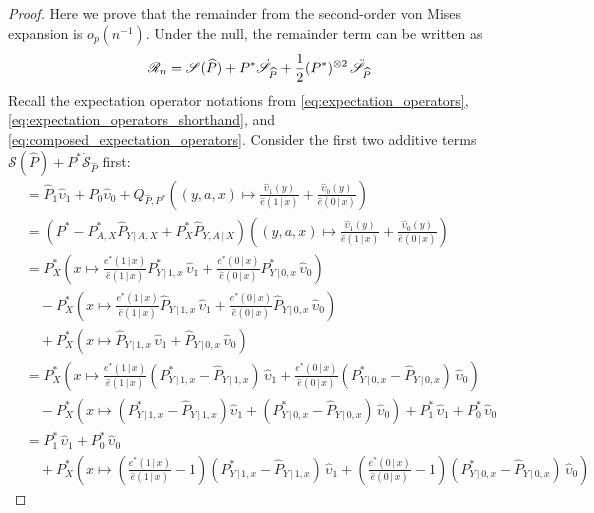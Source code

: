 \documentclass{article}
\theoremstyle{plain}
\theoremstyle{definition}
\theoremstyle{remark}
\newcommand{\of}[1]{\left(#1\right)}
\newcommand{\ucR}{\mathscr{R}}
\newcommand{\wh}[1]{\widehat{#1}}
\newcommand{\hP}{\widehat{P}}
\newcommand{\1}{\mathbbm{1}}
\newcommand{\STE}{\mathscr{S}}
\theoremstyle{plain}
\theoremstyle{definition}
\newcommand{\mymid}{\,|\,}
\begin{document}
\begin{proof}
    Here we prove that the remainder from the second-order von Mises expansion is $o_p(n^{-1})$. 
    Under the null, the remainder term can be written as 
    \[
    \ucR_n = \STE(\hP) + P^* \dot{\STE}_{\hP} + \frac{1}{2} (P^*)^{\otimes 2}\,\Ddot{\STE}_{\hP}
    \]
Recall the expectation operator notations from \eqref{eq:expectation_operators}, \eqref{eq:expectation_operators_shorthand}, and \eqref{eq:composed_expectation_operators}. Consider the first two additive terms $\STE(\hP) + P^* \dot{\STE}_{\hP}$ first:
\begin{align*}
      &= \hP_1 \wh\upsilon_1 + \hP_0 \wh\upsilon_0 + Q_{\hP, P^*} \of{(y,a,x) \mapsto \frac{\wh\upsilon_1(y)}{\hat{e}(1 \mymid x)} + \frac{\wh\upsilon_0(y)}{\hat{e}(0 \mymid x)}}\\
     &= \of{P^* - P^*_{A, X} \hP_{Y \mymid A, X} + P^*_X \hP_{Y, A \mymid X}} \of{(y,a,x) \mapsto \frac{\wh\upsilon_1(y)}{\hat{e}(1 \mymid x)} + \frac{\wh\upsilon_0(y)}{\hat{e}(0 \mymid x)}}\\
     &= P^*_X \of{x \mapsto \frac{e^*(1 \mymid x)}{\hat{e}(1 \mymid x)} P^*_{Y \mymid 1, x} \, \wh\upsilon_1 + \frac{e^*(0 \mymid x)}{\hat{e}(0 \mymid x)} P^*_{Y \mymid 0, x} \, \wh\upsilon_0}\\
     &\quad - P^*_X \of{x \mapsto \frac{e^*(1 \mymid x)}{\hat{e}(1 \mymid x)} \hP_{Y \mymid 1, x} \, \wh\upsilon_1 + \frac{e^*(0 \mymid x)}{\hat{e}(0 \mymid x)} \hP_{Y \mymid 0, x} \, \wh\upsilon_0}\\
     & \quad + P^*_X \of{x \mapsto \hP_{Y \mymid 1, x} \, \wh\upsilon_1 + \hP_{Y \mymid 0, x} \, \wh\upsilon_0}\\
     & = P^*_X \of{x \mapsto \frac{e^*(1 \mymid x)}{\hat{e}(1 \mymid x)} (P^*_{Y \mymid 1, x} - \hP_{Y \mymid 1, x}) \, \wh\upsilon_1 + \frac{e^*(0 \mymid x)}{\hat{e}(0 \mymid x)} (P^*_{Y \mymid 0, x} - \hP_{Y \mymid 0, x}) \,\wh\upsilon_0}\\
     & \quad - P^*_X \of{ x \mapsto (P^*_{Y \mymid 1, x} - \hP_{Y \mymid 1, x}) \wh\upsilon_1 + (P^*_{Y \mymid 0, x} - \hP_{Y \mymid 0, x}) \, \wh\upsilon_0} + P_1^* \, \wh\upsilon_1 + P_0^* \, \wh\upsilon_0\\
     &= P_1^* \, \wh\upsilon_1 + P_0^* \, \wh\upsilon_0\\
     & \quad + P^*_X \of{x \mapsto \of{\frac{e^*(1 \mymid x)}{\hat{e}(1 \mymid x)}-1} (P^*_{Y \mymid 1, x} - \hP_{Y \mymid 1, x}) \,\wh\upsilon_1 + \of{\frac{e^*(0 \mymid x)}{\hat{e}(0 \mymid x)}-1} (P^*_{Y \mymid 0, x} - \hP_{Y \mymid 0, x}) \, \wh\upsilon_0}

\end{align*}
\end{proof}
\end{document}

